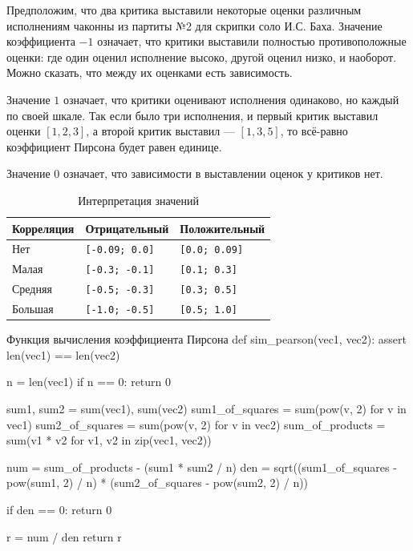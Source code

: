 Предположим, что два критика выставили некоторые оценки различным исполнениям чаконны из партиты №2 для скрипки соло И.С. Баха. Значение коэффициента \(-1\) означает, что критики выставили полностью противоположные оценки: где один оценил исполнение высоко, другой оценил низко, и наоборот. Можно сказать, что между их оценками есть зависимость.

Значение \(1\) означает, что критики оценивают исполнения одинаково, но каждый по своей шкале. Так если было три исполнения, и первый критик выставил оценки \([1, 2, 3]\), а второй критик выставил — \([1, 3, 5]\), то всё-равно коэффициент Пирсона будет равен единице.

Значение \(0\) означает, что зависимости в выставлении оценок у критиков нет.
\begin{table}[h!]
  \caption{Интерпретация значений}
  \begin{center}
    \begin{tabular}{lll}
      \toprule
      \textbf{Корреляция} & \textbf{Отрицательный} & \textbf{Положительный} \\
      \midrule
      Нет     & \texttt{[-0.09; 0.0]} & \texttt{[0.0; 0.09]} \\
      Малая   & \texttt{[-0.3; -0.1]} & \texttt{[0.1; 0.3]} \\
      Средняя & \texttt{[-0.5; -0.3]} & \texttt{[0.3; 0.5]} \\
      Большая & \texttt{[-1.0; -0.5]} & \texttt{[0.5; 1.0]} \\
      \bottomrule
    \end{tabular}
  \end{center}
\end{table}

\begin{pylst}{Функция вычисления коэффициента Пирсона}{}
def sim_pearson(vec1, vec2):
    assert len(vec1) == len(vec2)

    n = len(vec1)
    if n == 0:
        return 0

    sum1, sum2 = sum(vec1), sum(vec2)
    sum1_of_squares = sum(pow(v, 2) for v in vec1)
    sum2_of_squares = sum(pow(v, 2) for v in vec2)
    sum_of_products = sum(v1 * v2 for v1, v2 in zip(vec1, vec2))

    num = sum_of_products - (sum1 * sum2 / n)
    den = sqrt((sum1_of_squares - pow(sum1, 2) / n) *
               (sum2_of_squares - pow(sum2, 2) / n))

    if den == 0:
        return 0

    r = num / den
    return r
\end{pylst}

